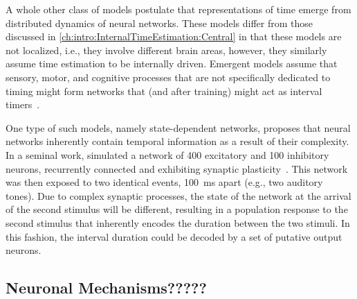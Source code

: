 A whole other class of models postulate that representations of time emerge from distributed dynamics of neural networks.
These models differ from those discussed in \autoref{ch:intro:InternalTimeEstimation:Central} in that these models are not localized, i.e., they involve different brain areas, however, they similarly assume time estimation to be internally driven.
Emergent models assume that sensory, motor, and cognitive processes that are not specifically dedicated to timing might form networks that (and after training) might act as interval timers~\cite{Wittmann2013NatRevNeurosci}.
\par
One type of such models, namely state-dependent networks, proposes that neural networks inherently contain temporal information as a result of their complexity.
In a seminal work, \citeauthor{Karmarkar2007Neuron} simulated a network of 400 excitatory and 100 inhibitory neurons, recurrently connected and exhibiting synaptic plasticity~\cite{Karmarkar2007Neuron}.
This network was then exposed to two identical events, 100~ms apart (e.g., two auditory tones).
Due to complex synaptic processes, the state of the network at the arrival of the second stimulus will be different, resulting in a population response to the second stimulus that inherently encodes the duration between the two stimuli.
In this fashion, the interval duration could be decoded by a set of putative output neurons.

\subsection{Neuronal Mechanisms?????}
\label{ch:intro:InternalTimeEstimation:}

    


